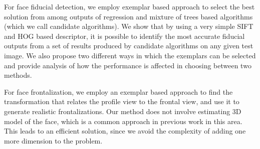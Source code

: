 For face fiducial detection, we employ exemplar based approach to select the best solution 
from among outputs of regression and mixture of trees based algorithms (which we call candidate 
algorithms). We show that by using a very simple SIFT and HOG based descriptor, it is possible to 
identify the most accurate fiducial outputs from a set of results produced by candidate algorithms 
on any given test image. We also propose two different ways in which the exemplars can be selected
and provide analysis of how the performance is affected in choosing between two methods.

For face frontalization, we employ an exemplar based approach to find the transformation that relates 
the profile view to the frontal view, and use it to generate realistic frontalizations. Our method 
does not involve estimating 3D model of the face, which is a common approach in previous work in 
this area. This leads to an efficient solution, since we avoid the complexity of adding one more 
dimension to the problem. 
